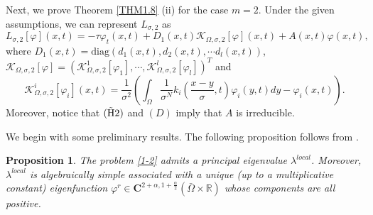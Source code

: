 \documentclass[11pt,reqno]{amsart}
\newtheorem{proposition}[theorem]{Proposition}
\numberwithin{equation}{section}
\begin{document}
Next, we prove Theorem \ref{THM1.8} (ii) for the case $m=2$.
Under the given assumptions, we can represent $L_{\sigma,2}$ as
\begin{equation*}
L_{\sigma,2}[\varphi](x,t) = -\tau\varphi_{t}(x,t) + D_{1}(x,t)\mathcal{K}_{\Omega,\sigma,2}[\varphi](x,t) + A(x,t)\varphi(x,t),
\end{equation*}
where $ D_{1}(x,t) = \text{diag}\left( d_{1}(x,t),d_{2}(x,t),\cdots d_{l}(x,t)  \right)$, $\mathcal{K}_{\Omega,\sigma,2}[\varphi]=
\left( \mathcal{K}^{1}_{\Omega,\sigma,2}[\varphi_{1}], \cdots, \mathcal{K}^{l}_{\Omega,\sigma,2}[\varphi_{l}] \right)^{T}$ and
\begin{equation*}
\mathcal{K}^{i}_{\Omega,\sigma,2}[\varphi_{i}](x,t)=
\frac{1}{\sigma^{2}} \left( \int_{\Omega} \frac{1}{\sigma^{N}}k_{i}\left(\frac{x-y}{\sigma},t \right)\varphi_{i}(y,t)dy - \varphi_{i}(x,t) \right).
\end{equation*}
Moreover, notice that ${ \rm (\tilde{H}2)}$ and $(D)$ imply that $A$ is irreducible.



We begin with some preliminary results.
The following proposition follows from \cite{baihe,Anton0}.
%
%
\begin{proposition}
The problem \eqref{1-2} admits a principal eigenvalue $\lambda^{local}$. Moreover, $\lambda^{local}$ is algebraically simple associated with a unique (up to a multiplicative constant) eigenfunction $\varphi^{r}\in \mathbf{C}^{2+\alpha,1+\frac{\alpha}{2}}(\bar\Omega\times\mathbb{R})$ whose components are all positive.
\end{proposition}
\end{document}
